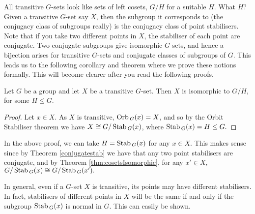 All transitive $G$-sets look like sets of left cosets, $G/H$ for a suitable $H$. What $H$?
Given a transitive $G$-set say $X$, then the subgroup it corresponds to (the conjugacy
class of subgroups really) is the conjugacy class of point stabilisers.
Note that if you take two different points in $X$, the stabiliser of each point are
conjugate. Two conjugate subgroups give isomorphic $G$-sets, and hence a bijection arises for
transitive $G$-sets and conjugate classes of subgroups of $G$. This leads us to the following corollary and theorem where we prove these notions formally. This will become clearer after you read the following proofs.

\begin{corollary}
    Let $G$ be a group and let $X$ be a transitive $G$-set. Then
    $X$ is isomorphic to $G/H$, for some $H\leq G$.
\end{corollary}

\begin{proof}
    Let $x\in X.$ As $X$ is transitive, $\operatorname*{Orb}{}_G(x) = X$, and so by the Orbit Stabiliser theorem we have $X \cong G/\operatorname*{Stab}{}_{G}(x)$, where $ \operatorname*{Stab}{}_{G}(x) = H \leq G.$ 
\end{proof}
\begin{remark}
    In the above proof, we can take $H=\operatorname*{Stab}{}_{G}(x)$ for any $x\in X.$ This makes sense since by Theorem \ref{conjugatestab} we have that any two point stabilisers are conjugate, and by Theorem \ref{thm:cosetsIsomorphic}, for any $x' \in X,$ $G/\operatorname*{Stab}{}_{G}(x) \cong G/\operatorname*{Stab}{}_{G}(x').$
\end{remark}

In general, even if a $G$-set $X$ is transitive, its points may have different stabilisers. In fact, stabilisers of different points in $X$ will be the same if and only if the subgroup $\operatorname*{Stab}{}_G(x)$ is normal in $G.$ This can easily be shown.


